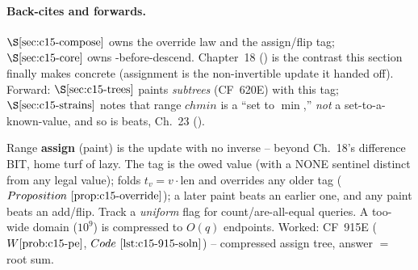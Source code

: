 \paragraph{Back-cites and forwards.}
\(\secref{c15-compose}\) owns the override law and the assign/flip tag; \(\secref{c15-core}\) owns -before-descend.  Chapter~18 () is the contrast this section finally makes concrete (assignment is the non-invertible update it handed off).  Forward: \(\secref{c15-trees}\) paints \emph{subtrees} (CF~620E) with this tag; \(\secref{c15-strains}\) notes that range \(\mathit{chmin}\) is a ``set to \(\min\),'' \emph{not} a set-to-a-known-value, and so is beats, Ch.~23 ().

\begin{recallbox}
Range \textbf{assign} (paint) is the update with no inverse -- beyond Ch.~18's difference BIT, home turf of lazy.  The tag is the owed value (with a NONE sentinel distinct from any legal value);  folds \(t_v=v\cdot\text{len}\) and overrides any older tag (\(\propref{c15-override}\)); a later paint beats an earlier one, and any paint beats an add/flip.  Track a \emph{uniform} flag for count/are-all-equal queries.  A too-wide domain (\(10^9\)) is compressed to \(O(q)\) endpoints.  Worked: CF~915E (\(\probref{c15-pe}\), \(\coderef{c15-915-soln}\)) -- compressed assign tree, answer \(=\) root sum.
\end{recallbox}
